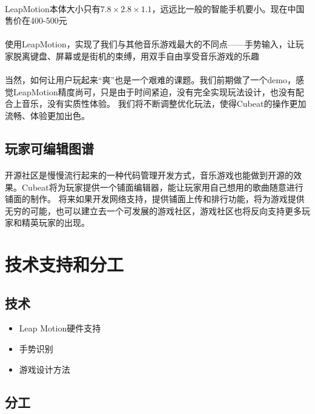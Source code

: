 \documentclass{article} \usepackage{CJK}
\begin{document}
\paragraph{}
LeapMotion本体大小只有$7.8\times2.8\times1.1$，远远比一般的智能手机要小。现在中国售价在400-500元
\paragraph{}
使用LeapMotion，实现了我们与其他音乐游戏最大的不同点——手势输入，让玩家脱离键盘、屏幕或是街机的束缚，用双手自由享受音乐游戏的乐趣
\paragraph{}
当然，如何让用户玩起来“爽”也是一个艰难的课题。我们前期做了一个demo，感觉LeapMotion精度尚可，只是由于时间紧迫，没有完全实现玩法设计，也没有配合上音乐，没有实质性体验。
我们将不断调整优化玩法，使得Cubeat的操作更加流畅、体验更加出色。
\subsection{玩家可编辑图谱}
\paragraph{}
开源社区是慢慢流行起来的一种代码管理开发方式，音乐游戏也能做到开源的效果。Cubeat将为玩家提供一个铺面编辑器，能让玩家用自己想用的歌曲随意进行铺面的制作。
将来如果开发网络支持，提供铺面上传和排行功能，将为游戏提供无穷的可能，也可以建立去一个可发展的游戏社区，游戏社区也将反向支持更多玩家和精英玩家的出现。
\section{技术支持和分工}
\subsection{技术}
\begin{itemize}
  \item Leap Motion硬件支持
  \item 手势识别
  \item 游戏设计方法
\end{itemize}
\subsection{分工}
\end{document}
